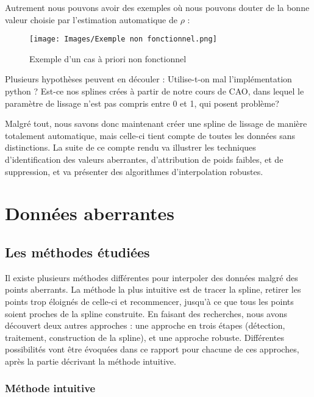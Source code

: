 \documentclass[a4paper,12pt]{article} %
\begin{document}
                Autrement nous pouvons avoir des exemples où nous pouvons douter de la bonne valeur choisie par l'estimation automatique de $\rho$ :
                
                \begin{figure}[H]
                \begin{center}
                \texttt{[image: Images/Exemple non fonctionnel.png]} 
                \end{center}
                \caption{Exemple d'un cas à priori non fonctionnel}
                \label{CasNonfonctionnel}
                \end{figure} 
                
                Plusieurs hypothèses peuvent en découler : Utilise-t-on mal l'implémentation python ? Est-ce nos splines crées à partir de notre cours de CAO, dans lequel le paramètre de lissage n'est pas compris entre 0 et 1, qui posent problème?
                
                Malgré tout, nous savons donc maintenant créer une spline de lissage de manière totalement automatique, mais celle-ci tient compte de toutes les données sans distinctions. La suite de ce compte rendu va illustrer les techniques d'identification des valeurs aberrantes, d'attribution de poids faibles, et de suppression, et va présenter des algorithmes d'interpolation robustes.


	\section{Données aberrantes}

		\subsection{Les méthodes étudiées}
		   	Il existe plusieurs méthodes différentes pour interpoler des données malgré des points aberrants. La méthode la plus intuitive est de tracer la spline, retirer les points trop éloignés de celle-ci et recommencer, jusqu'à ce que tous les points soient proches de la spline construite. En faisant des recherches, nous avons découvert deux autres approches : une approche en trois étapes (détection, traitement, construction de la spline), et une approche robuste. Différentes possibilités vont être évoquées dans ce rapport pour chacune de ces approches, après la partie décrivant la méthode intuitive.
            
			\subsubsection{Méthode intuitive}
			
\end{document}

